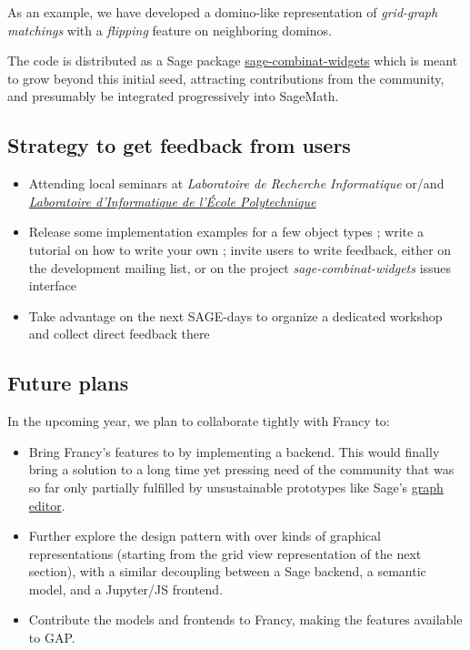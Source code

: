 \documentclass{deliverablereport}
\begin{document}
As an example, we have developed a domino-like representation of
\emph{grid-graph matchings} with a \emph{flipping} feature on neighboring dominos.


The code is distributed as a Sage package
\href{https://github.com/sagemath/sage-combinat-widgets/}{sage-combinat-widgets}
which is meant to grow beyond this initial seed, attracting
contributions from the community, and presumably be integrated
progressively into SageMath.

\subsection{Strategy to get feedback from users}

\begin{itemize}
  \item Attending local seminars at \emph{Laboratoire de Recherche Informatique} or/and \emph{\href{https://www.lix.polytechnique.fr/}{Laboratoire d'Informatique de l'École Polytechnique}}
  \item Release some implementation examples for a few object types ; write a tutorial on how to write your own ; invite users to write feedback, either on the development mailing list, or on the  project \emph{sage-combinat-widgets} issues interface
  \item Take advantage on the next SAGE-days to organize a dedicated workshop and collect direct feedback there
\end{itemize}

\subsection{Future plans}

In the upcoming year, we plan to collaborate tightly with Francy to:
\begin{itemize}
\item Bring Francy's features to \Sage by implementing a backend. This
  would finally bring a solution to a long time yet pressing need of
  the community that was so far only partially fulfilled by
  unsustainable prototypes like Sage's
  \href{http://doc.sagemath.org/html/en/reference/graphs/sage/graphs/graph_editor.html}{graph editor}.
\item Further explore the design pattern with over kinds of graphical
  representations (starting from the grid view representation of the
  next section), with a similar decoupling between a Sage backend, a
  semantic model, and a Jupyter/JS frontend.
\item Contribute the models and frontends to Francy, making the
  features available to GAP.
\end{itemize}
\end{document}
